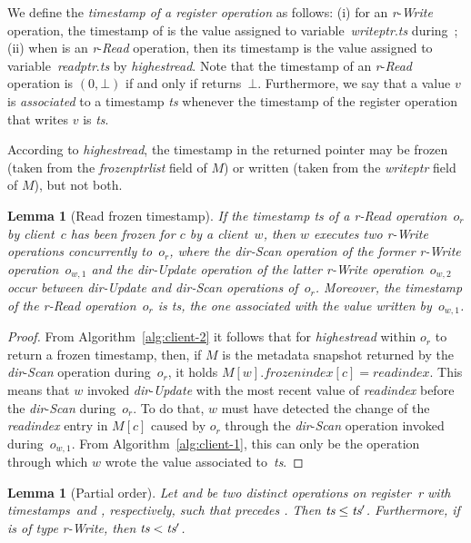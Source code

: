 \documentclass[oribibl]{llncs}
\newtheorem{lemma}[theorem]{Lemma}
\theoremstyle{definition-boldhead}
\newcommand{\var}[1]{\textit{#1}}
\newcommand{\op}[1]{\textsl{#1}}
\newcommand{\dir}{\var{dir}\xspace}
\begin{document}
We define the \emph{timestamp of a register operation \opr} as
follows: (i) for an \var{r}-\op{Write} operation, the timestamp of
\opr is the value assigned to variable~\var{writeptr}.\var{ts}
during~\opr; (ii) when \opr is an \var{r}-\op{Read} operation, then
its timestamp is the value assigned to variable~\var{readptr}.\var{ts}
by \op{highestread}.  Note that the timestamp of an \var{r}-\op{Read}
operation is $(0, \bot)$ if and only if \opr returns~$\bot$.
Furthermore, we say that a value $v$ is \emph{associated} to a
timestamp \var{ts} whenever the timestamp of the register operation
that writes $v$ is \var{ts}.

According to \op{highestread}, the timestamp in the returned pointer
may be frozen (taken from the \var{frozenptrlist} field of $M$) or written
(taken from the \var{writeptr} field of $M$), but not both.

\begin{lemma}[Read frozen timestamp]\label{lem:readfrozen}
  If the timestamp \var{ts} of a \var{r}-\op{Read} operation~$o_r$ by
  client~$c$ has been frozen for $c$ by a client~$w$, then $w$
  executes two \var{r}-\op{Write} operations concurrently to~$o_r$,
  where the \dir-\op{Scan} operation of the former \var{r}-\op{Write}
  operation~$o_{w,1}$ and the \dir-\op{Update} operation of the latter
  \var{r}-\op{Write} operation~$o_{w,2}$ occur between
  \dir-\op{Update} and \dir-\op{Scan} operations of~$o_r$.  Moreover,
  the timestamp of the \var{r}-\op{Read} operation~$o_r$ is \var{ts},
  the one associated with the value written by~$o_{w,1}$.
\end{lemma}

\begin{proof}
  From Algorithm~\ref{alg:client-2} it follows that for
  \op{highestread} within $o_r$ to return a frozen timestamp, then, if
  $M$ is the metadata snapshot returned by the \dir-\op{Scan}
  operation during~$o_r$, it holds $M[w].\var{frozenindex}[c] =
  \var{readindex}$. This means that $w$ invoked \dir-\op{Update} with
  the most recent value of \var{readindex} before the \dir-\op{Scan}
  during~$o_r$. To do that, $w$ must have detected the change of the
  \var{readindex} entry in $M[c]$ caused by $o_r$ through the
  \dir-\op{Scan} operation invoked during~$o_{w,1}$. From
  Algorithm~\ref{alg:client-1}, this can only be the operation through
  which $w$ wrote the value associated to~\var{ts}.
\end{proof}


\begin{lemma}[Partial order]\label{lem:partorder}
  Let \opr and \popr be two distinct operations on register~\var{r}
  with timestamps~\tsopr and \tspopr, respectively, such that \opr
  precedes \popr. Then $\tsopr \leq \tspopr$.  Furthermore, if \popr
  is of type \var{r}-\op{Write}, then $\tsopr < \tspopr$.
\end{lemma}
\end{document}
